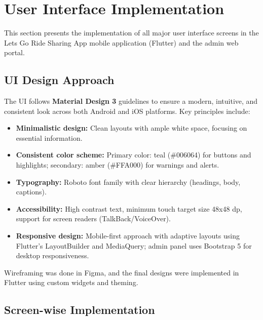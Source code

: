 
\section{User Interface Implementation}

This section presents the implementation of all major user interface screens in the Lets Go Ride Sharing App mobile application (Flutter) and the admin web portal.

\subsection{UI Design Approach}

The UI follows \textbf{Material Design 3} guidelines to ensure a modern, intuitive, and consistent look across both Android and iOS platforms. Key principles include:

\begin{itemize}
    \item \textbf{Minimalistic design:} Clean layouts with ample white space, focusing on essential information.
    \item \textbf{Consistent color scheme:} Primary color: teal (\#006064) for buttons and highlights; secondary: amber (\#FFA000) for warnings and alerts.
    \item \textbf{Typography:} Roboto font family with clear hierarchy (headings, body, captions).
    \item \textbf{Accessibility:} High contrast text, minimum touch target size 48x48 dp, support for screen readers (TalkBack/VoiceOver).
    \item \textbf{Responsive design:} Mobile-first approach with adaptive layouts using Flutter's LayoutBuilder and MediaQuery; admin panel uses Bootstrap 5 for desktop responsiveness.
\end{itemize}

Wireframing was done in Figma, and the final designs were implemented in Flutter using custom widgets and theming.

\subsection{Screen-wise Implementation}

\setlength{\fboxsep}{0pt}
\setlength{\fboxrule}{1pt}




